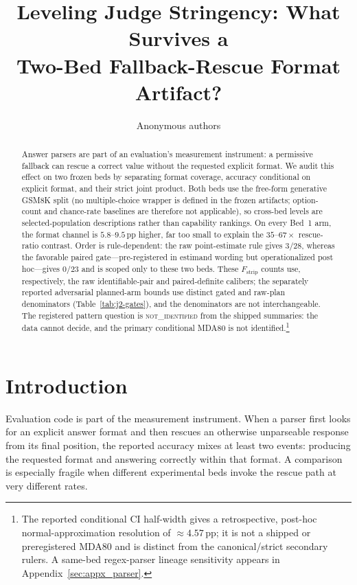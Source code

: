 \documentclass{article}
\title{Leveling Judge Stringency: What Survives a\\
Two-Bed Fallback-Rescue Format Artifact?}
\author{Anonymous authors}
\newcommand{\pp}{\,\mathrm{pp}}
\begin{document}
\raggedbottom
\maketitle

\begin{abstract}
Answer parsers are part of an evaluation's measurement instrument: a permissive
fallback can rescue a correct value without the requested explicit format.  We
audit this effect on two frozen beds by separating format coverage, accuracy
conditional on explicit format, and their strict joint product.  Both beds use
the free-form generative GSM8K split (no multiple-choice wrapper
is defined in the frozen artifacts; option-count and chance-rate baselines are
therefore not applicable), so cross-bed levels are selected-population
descriptions rather than capability rankings.  On every Bed~1 arm, the format
channel is $5.8$--$9.5\pp$ higher, far too small to explain the
$35$--$67\times$ rescue-ratio contrast.  Order is rule-dependent: the raw
point-estimate rule gives $3/28$, whereas the favorable paired
gate---pre-registered in estimand wording but operationalized post hoc---gives
$0/23$ and is scoped only to these two beds.  These $F_{\mathrm{strip}}$
counts use, respectively, the raw identifiable-pair and paired-definite
calibers; the separately reported adversarial planned-arm bounds use distinct
gated and raw-plan denominators (Table~\ref{tab:j2-gates}), and the
denominators are not interchangeable.  The registered pattern question is
\textsc{not\_identified} from the shipped summaries: the data cannot decide,
and the primary conditional MDA80 is not identified.\footnote{The reported
conditional CI half-width gives a retrospective, post-hoc normal-approximation
resolution of $\approx4.57\pp$; it is not a shipped or preregistered MDA80 and
is distinct from the canonical/strict secondary rulers.  A same-bed
regex-parser lineage sensitivity appears in Appendix~\ref{sec:appx_parser}.}
\end{abstract}

\section{Introduction}
\label{sec:intro}

Evaluation code is part of the measurement instrument.  When a parser first
looks for an explicit answer format and then rescues an otherwise unparseable
response from its final position, the reported accuracy mixes at least two
events: producing the requested format and answering correctly within that
format.  A comparison is especially fragile when different experimental beds
invoke the rescue path at very different rates.
\end{document}
